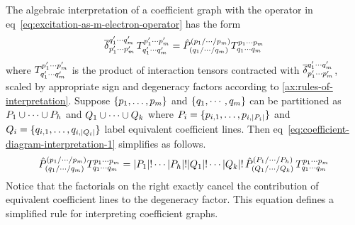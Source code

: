\documentclass[11pt]{article}
\numberwithin{equation}{section}
\begin{document}
\begin{rmk}\label{rmk:algebraic-interpretation-of-coefficient-graph}
The algebraic interpretation of a coefficient graph with the operator in eq~\ref{eq:excitation-as-m-electron-operator} has the form
\begin{align}\label{eq:coefficient-diagram-interpretation-1}
  \overline{\delta }_{p_1'\cdots p_m'}^{q_1'\cdots q_m'}\,
  T^{p_1'\cdots p_m'}_{q_1'\cdots q_m'}
=
  \hat{P}^{(p_1/\cdots /p_m)}_{(q_1/\cdots /q_m)}
  T^{p_1\cdots p_m}_{q_1\cdots q_m}
\end{align}
where $T^{p_1'\cdots p_m'}_{q_1'\cdots q_m'}$ is the product of interaction tensors contracted with $\overline{\delta }_{p_1'\cdots p_m'}^{q_1'\cdots q_m'}$, scaled by appropriate sign and degeneracy factors according to \cref{ax:rules-of-interpretation}.
Suppose $\{p_1,\ldots,p_m\}$ and $\{q_1,\cdots,q_m\}$ can be partitioned as $P_1\cup\cdots\cup P_h$ and $Q_1\cup\cdots\cup Q_k$ where $P_i=\{p_{i,1},\ldots,p_{i,|P_i|}\}$ and $Q_i=\{q_{i,1},\ldots,q_{i,|Q_i|}\}$ label equivalent coefficient lines.
Then eq~\ref{eq:coefficient-diagram-interpretation-1} simplifies as follows.
\begin{align}
  \hat{P}^{(p_1/\cdots /p_m)}_{(q_1/\cdots /q_m)}
  T^{p_1\cdots p_m}_{q_1\cdots q_m}
=
  |P_1|!\cdots|P_h|!|Q_1|!\cdots|Q_k|!\,
  \hat{P}^{(P_1/\cdots /P_h)}_{(Q_1/\cdots /Q_k)}\,
  T^{p_1\cdots p_m}_{q_1\cdots q_m}
\end{align}
Notice that the factorials on the right exactly cancel the contribution of equivalent coefficient lines to the degeneracy factor.
This equation defines a simplified rule for interpreting coefficient graphs.
\end{rmk}
\end{document}
